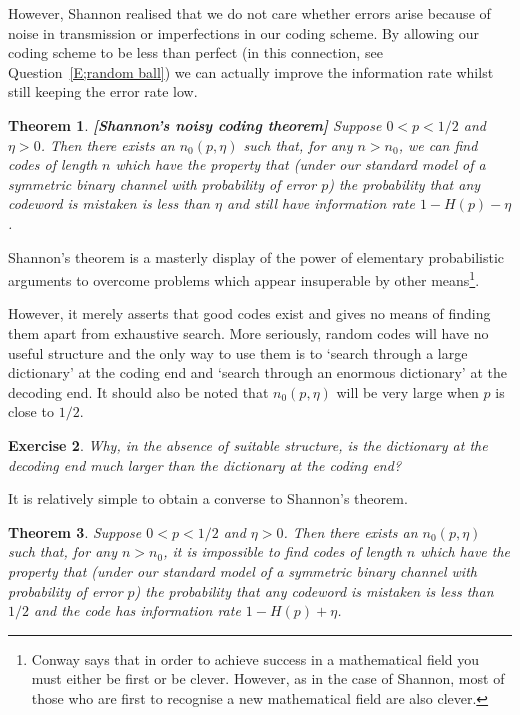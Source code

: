 \documentclass[12pt,a4paper]{article}
\theoremstyle{plain}
\newtheorem{theorem}{Theorem}[section]
\newtheorem{exercise}[theorem]{Exercise}
\theoremstyle{definition}
\begin{document}
    However, Shannon realised that
    we do not care whether errors arise because
    of noise in transmission or imperfections
    in our coding scheme. By allowing our coding
    scheme to be less than perfect
    (in this connection, see Question~\ref{E;random ball})
    we can
    actually improve the information rate whilst
    still keeping the error rate low.
    \begin{theorem}{\bf [Shannon's noisy coding theorem]}
        \label{T;Shannon}
        Suppose $0<p<1/2$ and $\eta>0$.
        Then there exists an $n_{0}(p,\eta)$ such that,
        for any $n>n_{0}$, we can find codes of
        length $n$ which have the property
        that (under our standard model
        of a symmetric binary
        channel with probability of error $p$) the probability
        that any codeword is mistaken is less than
        $\eta$ and still have
        information rate $1-H(p)-\eta$.
    \end{theorem}
    Shannon's theorem is a masterly display
    of the power of elementary probabilistic
    arguments to overcome problems
    which appear insuperable by other
    means\footnote{Conway says that in order to
    achieve success in a mathematical field
    you must either be first or be clever.
    However, as in the case of Shannon,
    most of those who are first
    to recognise a new mathematical field
    are also clever.}.

    However, it merely asserts that good codes
    exist and gives no means of finding
    them apart from exhaustive search.
    More seriously, random codes will have
    no useful structure and the only way to use them
    is to `search through a large dictionary'
    at the coding end and
    `search through an enormous dictionary'
    at the decoding end.
    It should also be noted that  $n_{0}(p,\eta)$
    will be very large when $p$ is close to $1/2$.

    \begin{exercise}
        Why, in the absence of suitable
        structure,
        is the dictionary at the decoding
        end much larger than the dictionary at the
        coding end?
    \end{exercise}

    It is relatively simple to obtain a converse
    to Shannon's theorem.
    \begin{theorem}
        \label{T;Shannon converse}
        Suppose $0<p<1/2$ and $\eta>0$.
        Then there exists an $n_{0}(p,\eta)$ such that,
        for any $n>n_{0}$, it is impossible
        to find codes of
        length $n$ which have the property
        that (under our standard model
        of a symmetric binary
        channel with probability of error $p$) the probability
        that any codeword is mistaken is less than
        $1/2$ and the code has
        information rate $1-H(p)+\eta$.
    \end{theorem}
\end{document}
